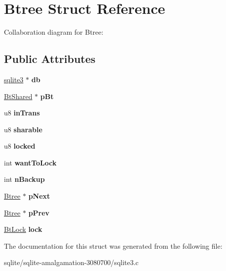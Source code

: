 \hypertarget{struct_btree}{\section{Btree Struct Reference}
\label{struct_btree}
}


Collaboration diagram for Btree\+:
\subsection*{Public Attributes}
\begin{DoxyCompactItemize}
\item 
\hypertarget{struct_btree_a2b3cfec48b6e9fcfd641d433816ae5c3}{\hyperlink{structsqlite3}{sqlite3} $\ast$ {\bfseries db}}\label{struct_btree_a2b3cfec48b6e9fcfd641d433816ae5c3}

\item 
\hypertarget{struct_btree_a63bab5d744d48d14368af048dddf2f20}{\hyperlink{struct_bt_shared}{Bt\+Shared} $\ast$ {\bfseries p\+Bt}}\label{struct_btree_a63bab5d744d48d14368af048dddf2f20}

\item 
\hypertarget{struct_btree_a50007448960c05dfd1fdc7db3e277685}{u8 {\bfseries in\+Trans}}\label{struct_btree_a50007448960c05dfd1fdc7db3e277685}

\item 
\hypertarget{struct_btree_a114f157127c76a1fbad8292e4b39c4dd}{u8 {\bfseries sharable}}\label{struct_btree_a114f157127c76a1fbad8292e4b39c4dd}

\item 
\hypertarget{struct_btree_a16fc8292bae9a66cfec03f6cb82d06a8}{u8 {\bfseries locked}}\label{struct_btree_a16fc8292bae9a66cfec03f6cb82d06a8}

\item 
\hypertarget{struct_btree_a97368ea300f0b74b8e80ea07da0cea2a}{int {\bfseries want\+To\+Lock}}\label{struct_btree_a97368ea300f0b74b8e80ea07da0cea2a}

\item 
\hypertarget{struct_btree_a7a3e7cf38bc9c3021a9e270a54ecfb1e}{int {\bfseries n\+Backup}}\label{struct_btree_a7a3e7cf38bc9c3021a9e270a54ecfb1e}

\item 
\hypertarget{struct_btree_a9e6d2ca44c10ed8ef0be004225a74ef5}{\hyperlink{struct_btree}{Btree} $\ast$ {\bfseries p\+Next}}\label{struct_btree_a9e6d2ca44c10ed8ef0be004225a74ef5}

\item 
\hypertarget{struct_btree_a0423f1c55c1fe6812161a49bb2bf604f}{\hyperlink{struct_btree}{Btree} $\ast$ {\bfseries p\+Prev}}\label{struct_btree_a0423f1c55c1fe6812161a49bb2bf604f}

\item 
\hypertarget{struct_btree_a943ed8799c9943f753a88cf44f1632dc}{\hyperlink{struct_bt_lock}{Bt\+Lock} {\bfseries lock}}\label{struct_btree_a943ed8799c9943f753a88cf44f1632dc}

\end{DoxyCompactItemize}


The documentation for this struct was generated from the following file\+:\begin{DoxyCompactItemize}
\item 
sqlite/sqlite-\/amalgamation-\/3080700/sqlite3.\+c\end{DoxyCompactItemize}
